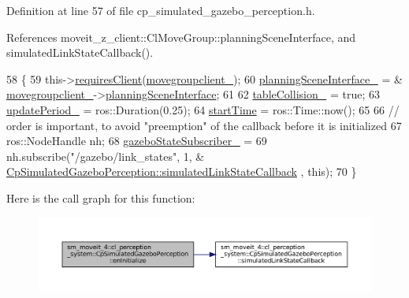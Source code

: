 Definition at line 57 of file cp\+\_\+simulated\+\_\+gazebo\+\_\+perception.\+h.



References moveit\+\_\+z\+\_\+client\+::\+Cl\+Move\+Group\+::planning\+Scene\+Interface, and simulated\+Link\+State\+Callback().


\begin{DoxyCode}
58             \{
59                 this->\hyperlink{classsmacc_1_1ISmaccComponent_a36c085d906fbae0fcaee817aaeafebf4}{requiresClient}(\hyperlink{classsm__moveit__4_1_1cl__perception__system_1_1CpSimulatedGazeboPerception_a3c361c94d4a8077d9bfac016a2614056}{movegroupclient\_});
60                 \hyperlink{classsm__moveit__4_1_1cl__perception__system_1_1CpSimulatedGazeboPerception_a34bbc7a8b23a1b1c2d3d4d30bd2fe767}{planningSceneInterface\_} = &
      \hyperlink{classsm__moveit__4_1_1cl__perception__system_1_1CpSimulatedGazeboPerception_a3c361c94d4a8077d9bfac016a2614056}{movegroupclient\_}->\hyperlink{classmoveit__z__client_1_1ClMoveGroup_a21c879b2683286aa21ce68f40195b4b5}{planningSceneInterface};
61                 
62                 \hyperlink{classsm__moveit__4_1_1cl__perception__system_1_1CpSimulatedGazeboPerception_a64beecc85d97c62bc4f884f4601d9c6a}{tableCollision\_} = \textcolor{keyword}{true};
63                 \hyperlink{classsm__moveit__4_1_1cl__perception__system_1_1CpSimulatedGazeboPerception_a185c4065558b0c320d73f366bb6b8277}{updatePeriod\_} = ros::Duration(0.25);
64                 \hyperlink{classsm__moveit__4_1_1cl__perception__system_1_1CpSimulatedGazeboPerception_af27dcb3530d5f2e8919f5e617b46275c}{startTime} = ros::Time::now();
65                 
66                 \textcolor{comment}{// order is important, to avoid "preemption" of the callback before it is initialized}
67                 ros::NodeHandle nh;
68                 \hyperlink{classsm__moveit__4_1_1cl__perception__system_1_1CpSimulatedGazeboPerception_a0808beb5b57079d863a56258279e202f}{gazeboStateSubscriber\_} =
69                     nh.subscribe(\textcolor{stringliteral}{"/gazebo/link\_states"}, 1, &
      \hyperlink{classsm__moveit__4_1_1cl__perception__system_1_1CpSimulatedGazeboPerception_a7914ffd20518c866a8a1e11254589d12}{CpSimulatedGazeboPerception::simulatedLinkStateCallback}
      , \textcolor{keyword}{this});
70             \}
\end{DoxyCode}
Here is the call graph for this function\+:
\nopagebreak
\begin{figure}[H]
\begin{center}
\leavevmode
\includegraphics[width=350pt]{classsm__moveit__4_1_1cl__perception__system_1_1CpSimulatedGazeboPerception_adebc30f6b1fc905f783de3f7bdf4a711_cgraph}
\end{center}
\end{figure}
